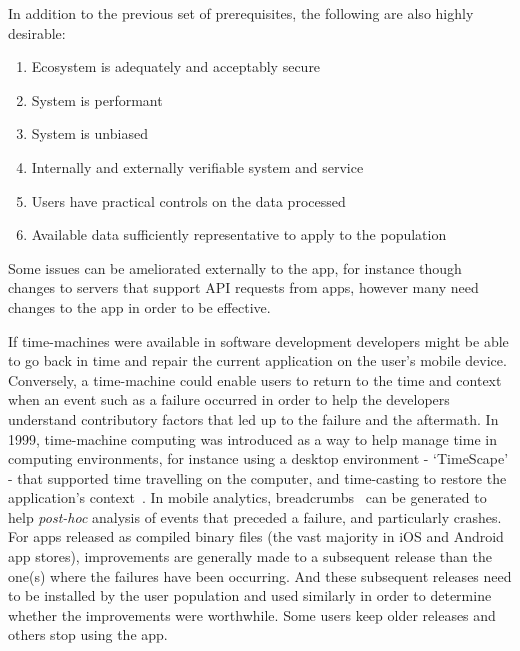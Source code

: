 In addition to the previous set of prerequisites, the following are also highly desirable:
\begin{enumerate} [i]
    \item Ecosystem is adequately and acceptably secure
    \item System is performant
    \item System is unbiased
    \item Internally and externally verifiable system and service
    \item Users have practical controls on the data processed
    \item Available data sufficiently representative to apply to the population
\end{enumerate}

Some issues can be ameliorated externally to the app, for instance though changes to servers that support API requests from apps, however many need changes to the app in order to be effective. 

If time-machines were available in software development developers might be able to go back in time and repair the current application on the user's mobile device. Conversely, a time-machine could enable users to return to the time and context when an event such as a failure occurred in order to help the developers understand contributory factors that led up to the failure and the aftermath. In 1999, time-machine computing was introduced as a way to help manage time in computing environments, for instance using a desktop environment - `TimeScape' - that supported time travelling on the computer, and time-casting to restore the application's context~\citep{rekimoto1999_time_machine_computing}. In mobile analytics, breadcrumbs~\citep{MacLean2015_pro_android_5_book} can be generated to help \emph{post-hoc} analysis of events that preceded a failure, and particularly crashes. 
%
For apps released as compiled binary files (the vast majority in iOS and Android app stores), improvements are generally made to a subsequent release than the one(s) where the failures have been occurring. And these subsequent releases need to be installed by the user population and used similarly in order to determine whether the improvements were worthwhile. Some users keep older releases and others stop using the app. 



